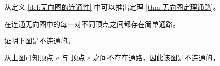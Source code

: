 从定义 \ref{def:无向图的连通性} 中可以推出定理 \ref{thm:无向图定理通路}。

\begin{theorem}\label{thm:无向图定理通路}
    在连通无向图中的每一对不同顶点之间都存在简单通路。
\end{theorem}

\begin{collections}
    \begin{example}
        证明下图是不连通的。
        \begin{center}
        \end{center}
    \end{example}
    \begin{solution}
        从上图可知顶点 $a$ 与 顶点 $e$ 之间不存在通路，因此该图是不连通的。
    \end{solution}
\end{collections}

